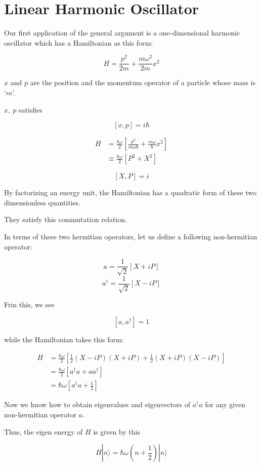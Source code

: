 \section{Linear Harmonic Oscillator}


Our first application of the general argument is a one-dimensional harmonic oscillator which has a Hamiltonian as this form:

\begin{equation}
H = \frac{p^2}{2m}+\frac{m\omega^2}{2m}x^2
\end{equation}

$x$ and $p$ are the position and the momentum operator of a particle whose mass is `$m$'.

$x,\ p$ satisfies

\[[x, p] = i\hbar \]

\[\begin{split}
H &= \frac{\hbar\omega}{2}\left[\frac{p^2}{m\omega\hbar}+\frac{m\omega}{\hbar}x^2\right]\\
&\equiv\frac{\hbar\omega}{2}[P^2+X^2]
\end{split} \]

\[[X, P] = i \]

By factorizing an energy unit, the Hamiltonian has a quadratic form of these two dimensionless quantities. 

They satisfy this commutation relation. 

In terms of these two hermitian operators, let us define a following non-hermitian operator:

\[a = \frac{1}{\sqrt{2}}[X+iP] \]
\[a^\dagger = \frac{1}{\sqrt{2}}[X-iP] \]

Frin this, we see

\[[a,a^\dagger] = 1 \]

while the Hamiltonian takes this form:

\[\begin{split}
H &= \frac{\hbar\omega}{2}\left[\frac{1}{2}(X-iP)(X+iP)+\frac{1}{2}(X+iP)(X-iP)\right]\\
&=\frac{\hbar\omega}{2}[a^\dagger a+a a^\dagger]\\
&=\hbar\omega\left[a^\dagger a+\frac{1}{2}\right]
\end{split} \]

Now we know how to obtain eigenvalues and eigenvectors of $a^\dagger a$ for any given non-hermitian operator $a$. 

Thus, the eigen energy of $H$ is given by this

\[H|n\rangle = \hbar\omega\left(n+\frac{1}{2}\right)|n\rangle \]

